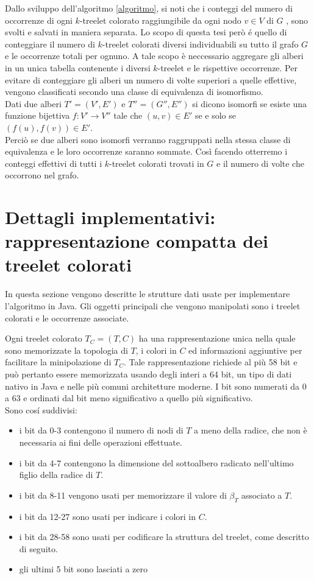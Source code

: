 Dallo sviluppo dell'algoritmo \ref{algoritmo}, si noti che i conteggi del numero di occorrenze di ogni $ k $-treelet colorato raggiungibile da ogni nodo $ v\in V $ di $ G $ , sono svolti e salvati in maniera separata.
Lo scopo di questa tesi per\`o \'e quello di conteggiare il numero di $ k $-treelet colorati diversi individuabili su tutto il grafo $ G $ e le occorrenze totali per ognuno.
A tale scopo \`e neccessario aggregare gli alberi in un unica tabella contenente i diversi $ k $-treelet e le rispettive occorrenze.
Per evitare di conteggiare gli alberi un numero di volte superiori a quelle effettive, vengono classificati secondo una classe di equivalenza di isomorfismo.\\
 Dati due alberi $ T' = (V',E')$ e $ T''=(G'',E'') $ si dicono isomorfi se esiste una funzione bijettiva $ f : V' \rightarrow V'' $ tale che $ (u,v)\in E' $ se e solo se $ (f(u),f(v)) \in E' $.\\
Perci\`o se due alberi sono isomorfi verranno raggruppati nella stessa classe di equivalenza e le loro occorrenze saranno sommate.
Cos\`i facendo otterremo i conteggi effettivi di tutti i $ k $-treelet colorati trovati in $ G $ e il numero di volte che occorrono nel grafo. 


\section{Dettagli implementativi: rappresentazione compatta dei treelet colorati}
\label{section 2}
In questa sezione vengono descritte le strutture dati usate per implementare l'algoritmo in Java.
Gli oggetti principali che vengono manipolati sono i treelet colorati e le occorrenze associate.

Ogni treelet colorato $ T_C = (T,C) $ ha una rappresentazione unica nella quale sono memorizzate la topologia di $ T $, i colori in $ C $ ed informazioni aggiuntive per facilitare la minipolazione di $T_C$.
Tale rappresentazione richiede al pi\`u 58 bit e pu\`o pertanto essere memorizzata usando degli interi a 64 bit, un tipo di dati nativo in Java e nelle pi\`u comuni architetture moderne.
I bit sono numerati da 0 a 63 e ordinati dal bit meno significativo a quello pi\`u significativo.\\
Sono cos\'i suddivisi:
\begin{itemize}
	\item i bit da 0-3 contengono il numero di nodi di $ T $ a meno della radice, che non \`e necessaria ai fini delle operazioni effettuate.
	\item i bit da 4-7 contengono la dimensione del sottoalbero radicato nell'ultimo figlio della radice di $ T $.
	\item i bit da 8-11 vengono usati per memorizzare il valore di $ \beta_T $ associato a $ T $.
	\item i bit da 12-27 sono usati per indicare i colori in $ C $.
	\item i bit da 28-58 sono usati per codificare la struttura del treelet, come descritto di seguito.
	\item gli ultimi 5 bit sono lasciati a zero
\end{itemize}\mbox{}\\

